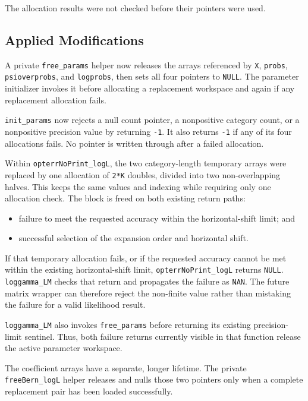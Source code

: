 \documentclass[11pt,a4paper]{article}
\begin{document}
The allocation results were not checked before their pointers were used.

\subsection{Applied Modifications}

A private \texttt{free\_params} helper now releases the arrays referenced by
\texttt{X}, \texttt{probs}, \texttt{psioverprobs}, and \texttt{logprobs}, then
sets all four pointers to \texttt{NULL}. The parameter initializer invokes it
before allocating a replacement workspace and again if any replacement
allocation fails.

\texttt{init\_params} now rejects a null count pointer, a nonpositive category
count, or a nonpositive precision value by returning \texttt{-1}. It also
returns \texttt{-1} if any of its four allocations fails. No pointer is written
through after a failed allocation.

Within \texttt{opterrNoPrint\_logL}, the two category-length temporary arrays
were replaced by one allocation of \texttt{2*K} doubles, divided into two
non-overlapping halves. This keeps the same values and indexing while requiring
only one allocation check. The block is freed on both existing return paths:

\begin{itemize}

\item failure to meet the requested accuracy within the horizontal-shift
limit; and

\item successful selection of the expansion order and horizontal shift.

\end{itemize}

If that temporary allocation fails, or if the requested accuracy cannot be met
within the existing horizontal-shift limit, \texttt{opterrNoPrint\_logL}
returns \texttt{NULL}. \texttt{loggamma\_LM} checks that return and propagates
the failure as \texttt{NAN}. The future matrix wrapper can therefore reject the
non-finite value rather than mistaking the failure for a valid likelihood
result.

\texttt{loggamma\_LM} also invokes \texttt{free\_params} before returning
its existing precision-limit sentinel. Thus, both failure returns currently
visible in that function release the active parameter workspace.

The coefficient arrays have a separate, longer lifetime. The private
\texttt{freeBern\_logL} helper releases and nulls those two pointers only when
a complete replacement pair has been loaded successfully.
\end{document}
